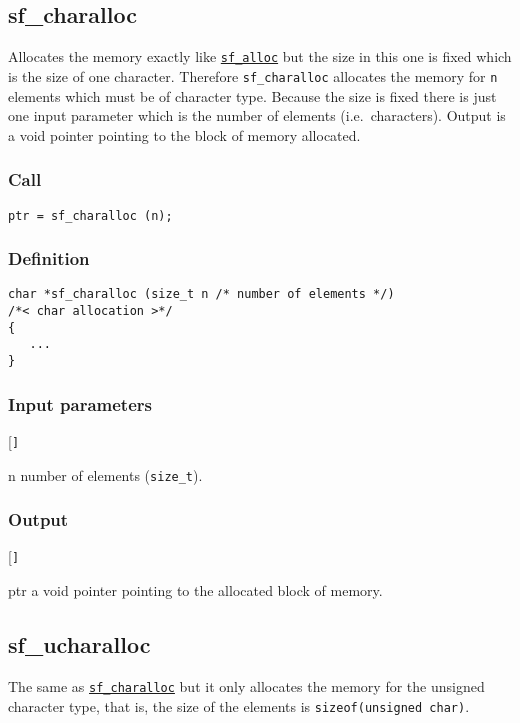 \subsection{{sf\_charalloc}}\label{sec:sf_charalloc}
Allocates the memory exactly like \hyperref[sec:sf_alloc]{\texttt{sf\_alloc}} but the size in this one is fixed which is the size of one character. Therefore \texttt{sf\_charalloc} allocates the memory for \texttt{n} elements which must be of character type. Because the size is fixed there is just one input parameter which is the number of elements (i.e.~characters). Output is a void pointer pointing to the block of memory allocated.

\subsubsection*{Call}
\begin{verbatim}ptr = sf_charalloc (n);\end{verbatim}

\subsubsection*{Definition}
\begin{verbatim}
char *sf_charalloc (size_t n /* number of elements */)
/*< char allocation >*/ 
{
   ...    
}
\end{verbatim}

\subsubsection*{Input parameters}
\begin{desclist}{\tt }{\quad}[\tt ]
   \setlength\itemsep{0pt}
   \item[n]	number of elements (\texttt{size\_t}).
\end{desclist}

\subsubsection*{Output}
\begin{desclist}{\tt }{\quad}[\tt ]
   \setlength\itemsep{0pt}
   \item[ptr]	a void pointer pointing to the allocated block of memory.
\end{desclist}




\subsection{{sf\_ucharalloc}}\label{sec:sf_ucharalloc}
The same as \hyperref[sec:sf_charalloc]{\texttt{sf\_charalloc}} but it only allocates the memory for the unsigned character type, that is, the size of the elements is \texttt{sizeof(unsigned char)}.

